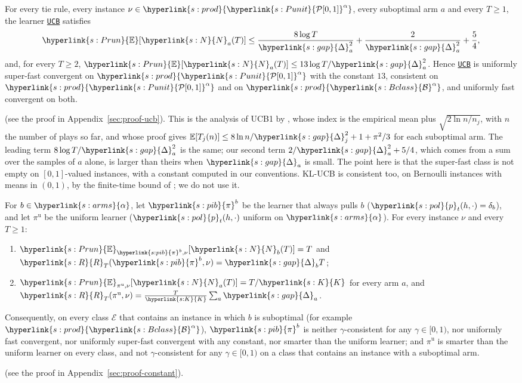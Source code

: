 \documentclass[11pt]{article}
\newcommand{\E}{\mathbb{E}}
\newcommand{\dt}[1]{\hypertarget{#1}{}}
\newcommand{\sy}[2]{{\hyperlink{#1}{#2}}}
\newcommand{\Punit}{\sy{s:Punit}{\mathcal{P}[0,1]}}
\newcommand{\Bclass}{\sy{s:Bclass}{\mathcal{B}}}
\newcommand{\arms}{\sy{s:arms}{\alpha}}
\newcommand{\Karms}{\sy{s:K}{K}}
\newcommand{\gap}{\sy{s:gap}{\Delta}}
\newcommand{\powc}[1]{\sy{s:prod}{#1^{\alpha}}}
\newcommand{\pol}{\sy{s:pol}{p}}
\newcommand{\Er}{\sy{s:Prun}{\E}}
\newcommand{\Np}{\sy{s:N}{N}}
\newcommand{\Reg}{\sy{s:R}{R}}
\newcommand{\Cons}{\sy{s:pib}{\pi}}
\newcommand{\ucb}{\hyperref[alg:ucb]{\texttt{UCB}}}
\begin{document}
\begin{proposition}\label{prop:ucb}
For every tie rule, every instance $\nu\in\powc{\Punit}$, every suboptimal arm $a$ and every $T\ge1$,
the learner \ucb{} satisfies
\begin{equation*}
  \Er[\Np_a(T)]\le\frac{8\log T}{\gap_a^2}+\frac{2}{\gap_a^2}+\frac54,
\end{equation*}
and, for every $T\ge2$, $\Er[\Np_a(T)]\le13\log T/\gap_a^2$. Hence \ucb{} is uniformly super-fast
convergent on $\powc{\Punit}$ with the constant $13$, consistent on $\powc{\Punit}$ and on
$\powc{\Bclass}$, and uniformly fast convergent on both.
\end{proposition}
(see the proof in Appendix~\ref{sec:proof-ucb}). This is the analysis of UCB1 by
\citet[Theorem~1]{ACF02}, whose index is the empirical mean plus $\sqrt{2\ln n/n_j}$, with $n$ the
number of plays so far, and whose proof gives $\E[T_j(n)]\le8\ln n/\gap_j^2+1+\pi^2/3$ for each
suboptimal arm. The leading term $8\log T/\gap_a^2$ is the same; our second term
$2/\gap_a^2+5/4$, which comes from a sum over the samples of $a$ alone, is larger than theirs when
$\gap_a$ is small. The point here is that the super-fast class is not empty on $[0,1]$-valued
instances, with a constant computed in our conventions. KL-UCB is consistent
too, on Bernoulli instances with means in $(0,1)$, by the finite-time bound of
\citet[Theorem~1]{CGMMS13}; we do not use it.

\begin{lemma}\label{lem:constant}
\dt{s:pib}For $b\in\arms$, let $\Cons^b$ be the learner that always pulls $b$ ($\pol_t(h,\cdot)=\delta_b$),
and let $\pi^{\mathrm{u}}$ be the uniform learner ($\pol_t(h,\cdot)$ uniform on $\arms$). For every
instance $\nu$ and every $T\ge1$:
\begin{enumerate}[label=(\roman*)]
  \item $\Er_{\Cons^b,\nu}[\Np_b(T)]=T$ and $\Reg_T(\Cons^b,\nu)=\gap_bT$;
  \item $\Er_{\pi^{\mathrm{u}},\nu}[\Np_a(T)]=T/\Karms$ for every arm $a$, and $\Reg_T(\pi^{\mathrm{u}},\nu)=\frac{T}{\Karms}\sum_a\gap_a$.
\end{enumerate}
Consequently, on every class $\mathcal E$ that contains an instance in which $b$ is suboptimal (for
example $\powc{\Bclass}$), $\Cons^b$ is neither $\gamma$-consistent for any $\gamma\in[0,1)$, nor uniformly
fast convergent, nor uniformly super-fast convergent with any constant, nor smarter than the
uniform learner; and $\pi^{\mathrm{u}}$ is smarter than the uniform learner on every class, and not
$\gamma$-consistent for any $\gamma\in[0,1)$ on a class that contains an instance with a suboptimal arm.
\end{lemma}
(see the proof in Appendix~\ref{sec:proof-constant}).
\end{document}
